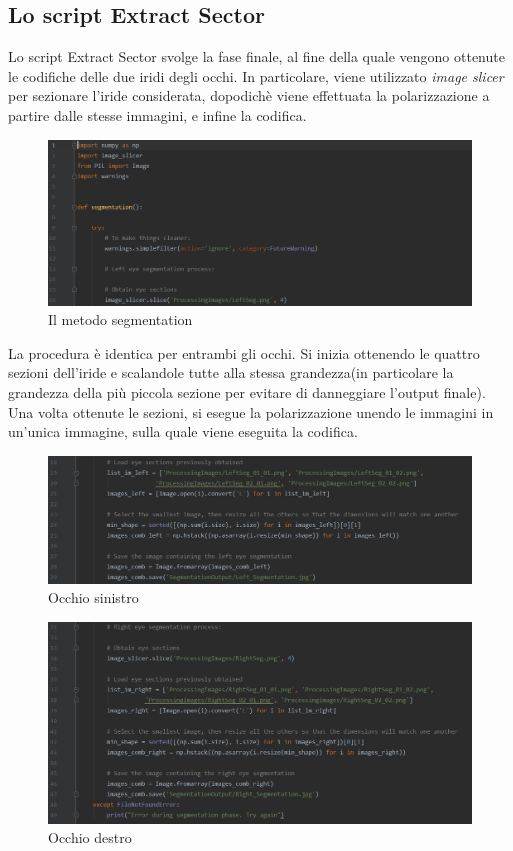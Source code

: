 \subsection{Lo script Extract Sector}
Lo script Extract Sector svolge la fase finale, al fine della quale vengono ottenute le codifiche delle due iridi degli occhi.
In particolare, viene utilizzato \emph{image slicer} per sezionare l'iride considerata, dopodichè viene effettuata la polarizzazione a partire dalle stesse immagini, e infine la codifica.
\begin{figure}[h!]
	\centering
	\includegraphics[width=120mm]{img/5/codice_1_9}
	\caption{\fontsize{10px}{0mm}\selectfont Il metodo segmentation \label{fig:codice_1_9}}
\end{figure}
La procedura è identica per entrambi gli occhi. Si inizia ottenendo le quattro sezioni dell'iride e scalandole tutte alla stessa grandezza(in particolare la grandezza della più piccola sezione per evitare di danneggiare l'output finale).
Una volta ottenute le sezioni, si esegue la polarizzazione unendo le immagini in un'unica immagine, sulla quale viene eseguita la codifica.\newpage
\begin{figure}[h!]
	\centering
	\includegraphics[width=120mm]{img/5/codice_1_10}
	\caption{\fontsize{10px}{0mm}\selectfont Occhio sinistro \label{fig:codice_1_10}}
\end{figure}

\begin{figure}[h!]
	\centering
	\includegraphics[width=120mm]{img/5/codice_1_11}
	\caption{\fontsize{10px}{0mm}\selectfont Occhio destro \label{fig:codice_1_11}}
\end{figure}
\newpage